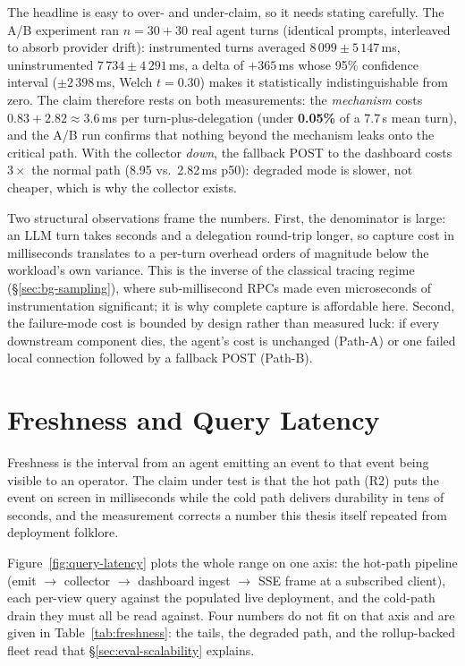 The headline is easy to over- and under-claim, so it needs stating
carefully. The A/B experiment ran $n{=}30{+}30$ real agent turns
(identical prompts, interleaved to absorb provider drift): instrumented
turns averaged $8\,099 \pm 5\,147$\,ms, uninstrumented
$7\,734 \pm 4\,291$\,ms, a delta of $+365$\,ms whose 95\% confidence
interval ($\pm 2\,398$\,ms, Welch $t = 0.30$) makes it statistically
indistinguishable from zero. The claim therefore rests on both
measurements: the \emph{mechanism} costs
$0.83 + 2.82 \approx 3.6$\,ms per turn-plus-delegation (under
\textbf{0.05\%} of a 7.7\,s mean turn), and the A/B run confirms that
nothing beyond the mechanism leaks onto the critical path. With the
collector \emph{down}, the fallback POST to the dashboard costs
$3\times$ the normal path (8.95 vs.\ 2.82\,ms p50): degraded mode is
slower, not cheaper, which is why the collector exists.

Two structural observations frame the numbers. First, the denominator is
large: an LLM turn takes seconds and a delegation round-trip longer, so
capture cost in milliseconds translates to a per-turn overhead orders of
magnitude below the workload's own variance. This is the inverse of the
classical tracing regime (\S\ref{sec:bg-sampling}), where sub-millisecond
RPCs made even microseconds of instrumentation significant; it is
why complete capture is affordable here. Second, the failure-mode cost is
bounded by design rather than measured luck: if every downstream component
dies, the agent's cost is unchanged (Path-A) or one failed local
connection followed by a fallback POST (Path-B).

\section{Freshness and Query Latency}
\label{sec:eval-freshness}

Freshness is the interval from an agent emitting an event to that event
being visible to an operator. The claim under test is that the hot path
(R2) puts the event on screen in milliseconds while the cold path
delivers durability in tens of seconds, and the measurement corrects a
number this thesis itself repeated from deployment folklore.

Figure~\ref{fig:query-latency} plots the whole range on one axis: the
hot-path pipeline (emit $\to$ collector $\to$ dashboard ingest $\to$ SSE
frame at a subscribed client), each per-view query against the populated
live deployment, and the cold-path drain they must all be read against.
Four numbers do not fit on that axis and are given in
Table~\ref{tab:freshness}: the tails, the degraded path, and the
rollup-backed fleet read that \S\ref{sec:eval-scalability} explains.

